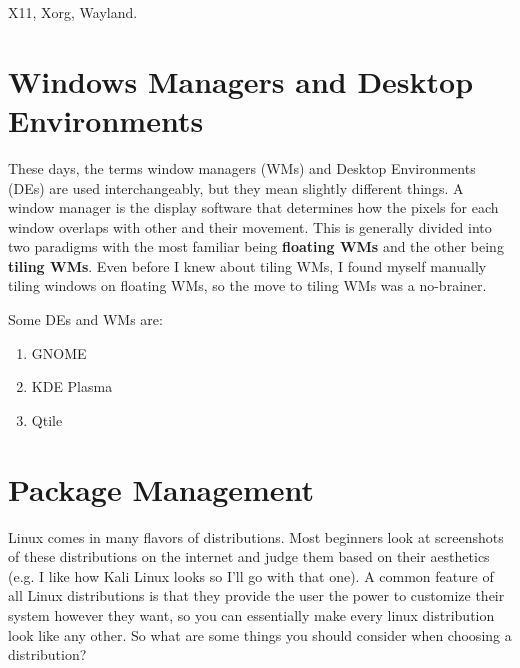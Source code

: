 \documentclass{article}
\theoremstyle{definition}
\begin{document}
  X11, Xorg, Wayland.

\section{Windows Managers and Desktop Environments}

  These days, the terms window managers (WMs) and Desktop Environments (DEs) are used interchangeably, but they mean slightly different things. A window manager is the display software that determines how the pixels for each window overlaps with other and their movement. This is generally divided into two paradigms with the most familiar being \textbf{floating WMs} and the other being \textbf{tiling WMs}. Even before I knew about tiling WMs, I found myself manually tiling windows on floating WMs, so the move to tiling WMs was a no-brainer. 
  
  Some DEs and WMs are: 
  \begin{enumerate}
    \item GNOME 
    \item KDE Plasma
    \item Qtile
  \end{enumerate}

\section{Package Management}
  
  Linux comes in many flavors of distributions. Most beginners look at screenshots of these distributions on the internet and judge them based on their aesthetics (e.g. I like how Kali Linux looks so I'll go with that one). A common feature of all Linux distributions is that they provide the user the power to customize their system however they want, so you can essentially make every linux distribution look like any other. So what are some things you should consider when choosing a distribution? 
\end{document}

